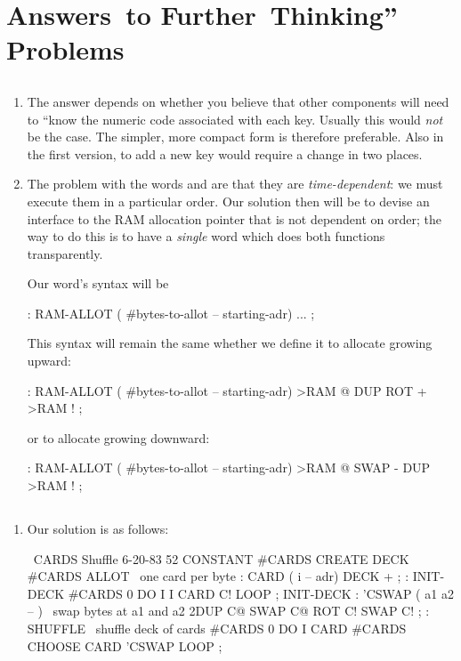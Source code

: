 
\chapter{Answers~to
Further~Thinking''
Problems}
\section{}
\begin{enumerate}
\item The answer depends on whether you believe that other components will
need to ``know the numeric code associated with each key.  Usually this
would \emph{not} be the case.  The simpler, more compact form is therefore
preferable.  Also in the first version, to add a new key would require a
change in two places.
\item The problem with the words  and  are
that they are \emph{time-dependent}:  we must execute them in a particular
order.  Our solution then will be to devise an interface to the RAM
allocation pointer that is not dependent on order; the way to do this is
to have a \emph{single} word which does both functions transparently.

Our word's syntax will be
\begin{Code}
: RAM-ALLOT   ( #bytes-to-allot -- starting-adr) 
    ... ;
\end{Code}
This syntax will remain the same whether we define it to allocate growing 
upward:
\begin{Code}
: RAM-ALLOT  ( #bytes-to-allot -- starting-adr)
    >RAM @  DUP ROT +  >RAM ! ;
\end{Code}
or to allocate growing downward:
\begin{Code}
: RAM-ALLOT  ( #bytes-to-allot -- starting-adr)
    >RAM @  SWAP -  DUP >RAM ! ;
\end{Code}
\end{enumerate}

\section{}

\ifeightyfour\begin{enumerate}
\item\fi Our solution is as follows:
\begin{Code}
\ CARDS Shuffle                              6-20-83
52 CONSTANT #CARDS
CREATE DECK  #CARDS ALLOT   \ one card per byte
: CARD ( i -- adr) DECK + ;
: INIT-DECK  #CARDS 0 DO  I  I CARD  C!  LOOP ;
INIT-DECK
: 'CSWAP  ( a1 a2 -- )  \  swap bytes at a1 and a2
   2DUP C@  SWAP C@  ROT C!  SWAP C! ;
: SHUFFLE   \  shuffle deck of cards
   #CARDS 0 DO  I CARD  #CARDS CHOOSE CARD  'CSWAP
   LOOP ;
\end{Code}
\ifeightyfour\end{enumerate}\fi

